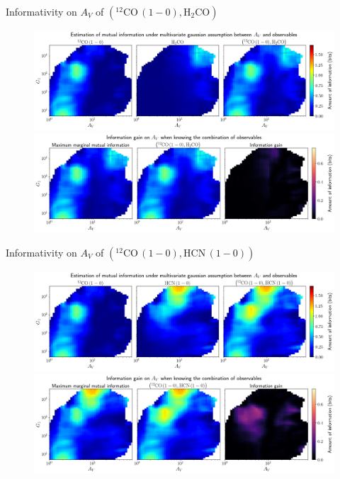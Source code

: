 \documentclass{beamer}
\begin{document}
\begin{frame}{Informativity on $A_V$ of $\left(\mathrm{^{12}CO\,(1-0)},\mathrm{H_2CO}\right)$}
    \begin{figure}
        \centering
        \includegraphics[width=0.95\linewidth]{../linearinfo/av__12co10_h2co_linearinfo.png}
        \vfill
        \includegraphics[width=0.95\linewidth]{../linearinfo/av__12co10_h2co_linearinfo_gain.png}
    \end{figure}
\end{frame}

\begin{frame}{Informativity on $A_V$ of $\left(\mathrm{^{12}CO\,(1-0)},\mathrm{HCN\,(1-0)}\right)$}
    \begin{figure}
        \centering
        \includegraphics[width=0.95\linewidth]{../linearinfo/av__12co10_hcn10_linearinfo.png}
        \vfill
        \includegraphics[width=0.95\linewidth]{../linearinfo/av__12co10_hcn10_linearinfo_gain.png}
    \end{figure}
\end{frame}
\end{document}
